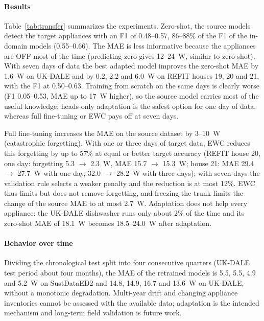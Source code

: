 \documentclass[fleqn,10pt]{wlscirep}
\begin{document}
\paragraph{Results} Table~\ref{tab:transfer} summarizes the experiments. Zero-shot, the source models detect the target appliances with an F1 of 0.48--0.57, 86--88\% of the F1 of the in-domain models (0.55--0.66). The MAE is less informative because the appliances are OFF most of the time (predicting zero gives 12--24~W, similar to zero-shot). With seven days of data the best adapted model improves the zero-shot MAE by 1.6~W on UK-DALE and by 0.2, 2.2 and 6.0~W on REFIT houses 19, 20 and 21, with the F1 at 0.50--0.63. Training from scratch on the same days is clearly worse (F1 0.05--0.53, MAE up to 17~W higher), so the source model carries most of the useful knowledge; heads-only adaptation is the safest option for one day of data, whereas full fine-tuning or EWC pays off at seven days.

Full fine-tuning increases the MAE on the source dataset by 3--10~W (catastrophic forgetting). With one or three days of target data, EWC reduces this forgetting by up to 57\% at equal or better target accuracy (REFIT house 20, one day: forgetting 5.3 $\rightarrow$ 2.3~W, MAE 15.7 $\rightarrow$ 15.3~W; house 21: MAE 29.4 $\rightarrow$ 27.7~W with one day, 32.0 $\rightarrow$ 28.2~W with three days); with seven days the validation rule selects a weaker penalty and the reduction is at most 12\%. EWC thus limits but does not remove forgetting, and freezing the trunk limits the change of the source MAE to at most 2.7~W. Adaptation does not help every appliance: the UK-DALE dishwasher runs only about 2\% of the time and its zero-shot MAE of 18.1~W becomes 18.5--24.0~W after adaptation.


\paragraph{Behavior over time} Dividing the chronological test split into four consecutive quarters (UK-DALE test period about four months), the MAE of the retrained models is 5.5, 5.5, 4.9 and 5.2~W on SustDataED2 and 14.8, 14.9, 16.7 and 13.6~W on UK-DALE, without a monotonic degradation. Multi-year drift and changing appliance inventories cannot be assessed with the available data; adaptation is the intended mechanism and long-term field validation is future work.
\end{document}
